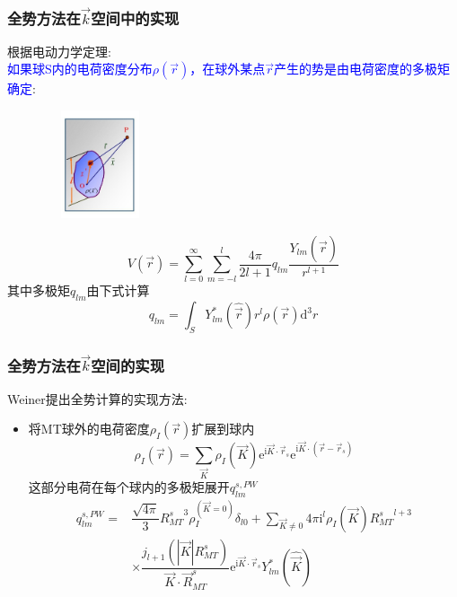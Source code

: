 \frame
{
\frametitle{全势方法在$\vec k$空间中的实现}
根据电动力学定理:\\\textcolor{blue}{如果球\textrm{S}内的电荷密度分布$\rho(\vec r)$，在球外某点$\vec r$产生的势是由电荷密度的多极矩确定}:
\begin{figure}[h!]
\vspace*{-15pt}
\centering
\includegraphics[height=1.25in,width=1.32in,viewport=1 22 507 575,clip]{Figures/potential_multipole.jpg}
\label{Potential-multipole-copy2}
\end{figure}
\begin{displaymath}
	V(\vec r)=\sum_{l=0}^{\infty}\sum_{m=-l}^{l}\dfrac{4\pi}{2l+1}q_{lm}\dfrac{Y_{lm}(\hat{\vec r})}{r^{l+1}}
\end{displaymath}
其中多极矩$q_{lm}$由下式计算
\begin{displaymath}
	q_{lm}=\int_SY_{lm}^{\ast}(\hat{\vec r})r^l\rho(\vec r)\mathrm{d}^3r
\end{displaymath}
}

\frame
{
	\frametitle{全势方法在$\vec k$空间的实现}
\textrm{Weiner}提出全势计算的实现方法:~\\
\begin{itemize}
	\item 将\textrm{MT}球外的电荷密度$\rho_I(\vec r)$扩展到球内
	\begin{displaymath}
		\rho_I(\vec r)=\sum_{\vec K}\rho_I(\vec K)\mathrm{e}^{\mathrm{i}\vec K\cdot\vec r_s}\mathrm{e}^{\mathrm{i}\vec K\cdot(\vec r-\vec r_s)}
	\end{displaymath}
	这部分电荷在每个球内的多极矩展开$q_{lm}^{s,PW}$
	\begin{displaymath}
		\begin{aligned}
			q_{lm}^{s,PW}=&\dfrac{\sqrt{4\pi}}3{R_{MT}^s}^3\rho_I^{(\vec K=0)}\delta_{l0}+\sum_{\vec K\neq0}4\pi\mathrm{i}^l\rho_I(\vec K){R_{MT}^s}^{l+3}\\
			&\times\dfrac{j_{l+1}(|\vec K|R_{MT}^s)}{\vec K\cdot\vec R_{MT}^s}\mathrm{e}^{\mathrm{i}\vec K\cdot\vec r_s}Y_{lm}^{\ast}(\hat{\vec K})
		\end{aligned}
	\end{displaymath}
\end{itemize}
}

